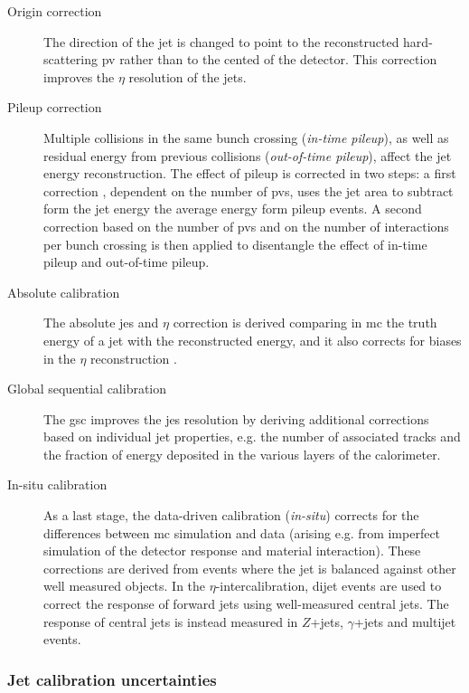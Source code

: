 \begin{description}
\item[Origin correction] The direction of the jet is changed to point to the reconstructed hard-scattering \gls{pv} rather than to the cented of the detector. This correction improves the $\eta$ resolution of the jets.

\item[Pileup correction] Multiple collisions in the same bunch crossing (\textit{in-time pileup}), as well as residual energy from previous collisions (\textit{out-of-time pileup}), affect the jet energy reconstruction. The effect of pileup is corrected in two steps: a first correction \cite{Cacciari:2007fd,TheATLAScollaboration:2013pia}, dependent on the number of \glspl{pv}, uses the jet area to subtract form the jet energy the average energy form pileup events. A second correction based on the number of \glspl{pv} and on the number of interactions per bunch crossing is then applied to disentangle the effect of in-time pileup and out-of-time pileup.

\item[Absolute calibration] The absolute \gls{jes} and $\eta$ correction is derived comparing in \gls{mc} the truth energy of a jet with the reconstructed energy, and it also corrects for biases in the $\eta$ reconstruction \cite{Aad2015jets}.

\item[Global sequential calibration] The \gls{gsc} \cite{ATLAS:2015oia} improves the \gls{jes} resolution by deriving additional corrections based on individual jet properties, e.g. the number of associated tracks and the fraction of energy deposited in the various layers of the calorimeter.

\item[In-situ calibration] As a last stage, the data-driven calibration (\textit{in-situ}) \cite{ATLAS:2015uwa} corrects for the differences between \gls{mc} simulation and data (arising e.g. from imperfect simulation of the detector response and material interaction). These corrections are derived from events where the jet \pt is balanced against other well measured objects. In the $\eta$-intercalibration, dijet events are used to correct the response of forward jets using well-measured central jets. The response of central jets is instead measured in $Z$+jets, $\gamma$+jets and multijet events. 
 
\end{description}

\subsubsection*{Jet calibration uncertainties}

